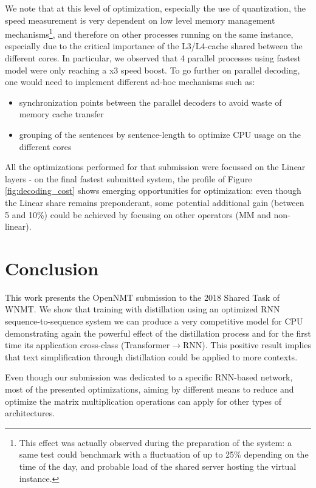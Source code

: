 \documentclass[11pt,a4paper]{article}
\begin{document}
We  note that at this level of optimization, especially the use
of quantization, the speed measurement is very dependent on low level
memory management mechanisms\footnote{This effect was actually observed
during the preparation of the system: a same test could benchmark with a fluctuation
of up to 25\% depending on the time of the day, and probable load of the
shared server hosting the virtual instance.}, and therefore on other
processes running on the same instance, especially due to the critical
importance of the L3/L4-cache shared between the different cores. In
particular, we observed that 4 parallel processes using fastest model
were only reaching a x3 speed boost. To go further on parallel
decoding, one would need to implement different ad-hoc mechanisms such as:
\begin{itemize}
\item synchronization points between
the parallel decoders to avoid waste of memory cache transfer
\item grouping of the sentences by sentence-length to optimize CPU
usage on the different cores
\end{itemize}

All the optimizations performed for that submission were focussed on the Linear layers - on the final fastest submitted system, the profile of Figure \ref{fig:decoding_cost} shows emerging opportunities for optimization: even though the Linear share remains preponderant, some potential additional gain (between 5 and 10\%) could be achieved by focusing on other operators (MM and non-linear).

\section{Conclusion}

This work presents the OpenNMT submission to the 2018 Shared Task of
WNMT. We show that training with distillation using an optimized RNN
sequence-to-sequence system we can produce a very competitive
model for CPU demonstrating again the powerful effect of the distillation process and for the first time its application cross-class (Transformer$\rightarrow$RNN). This positive result implies that text simplification through distillation could be applied to more contexts.

Even though our submission was dedicated to a specific RNN-based network, most of the presented optimizations, aiming by different means to reduce and optimize the matrix multiplication operations can apply for other types of architectures.
\end{document}
